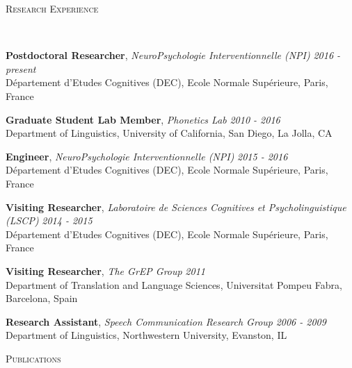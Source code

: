 \documentclass[9pt]{article}
\newenvironment{changemargin}[2]{%
  \begin{list}{}{%
    \setlength{\topsep}{0pt}%
    \setlength{\leftmargin}{#1}%
    \setlength{\rightmargin}{#2}%
    \setlength{\listparindent}{\parindent}%
    \setlength{\itemindent}{\parindent}%
    \setlength{\parsep}{\parskip}%
  }%
  \item[]}{\end{list}
}
\newcommand{\lineover}{
	\begin{changemargin}{-0.05in}{-0.05in}
		\vspace*{-8pt}
		\hrulefill \\
		\vspace*{-2pt}
	\end{changemargin}
}
\newcommand{\header}[1]{
	\begin{changemargin}{-0.5in}{-0.5in}
		\scshape{#1}\\
  	\lineover
	\end{changemargin}
}
\newenvironment{body} {
	\vspace*{-16pt}
	\begin{changemargin}{-0.25in}{-0.5in}
  }	
	{\end{changemargin}
}
\begin{document}
\smallskip


\header{Research Experience}

\begin{body}
	\vspace{14pt}
	\textbf{Postdoctoral Researcher}, \emph{NeuroPsychologie Interventionnelle (NPI)} \hfill \emph{2016 - present}\\
	D\'epartement d'Etudes Cognitives (DEC), Ecole Normale Sup\'erieure, Paris, France
	\medskip
	
	\textbf{Graduate Student Lab Member}, \emph{Phonetics Lab} \hfill \emph{2010 - 2016}\\
	Department of Linguistics, University of California, San Diego, La Jolla, CA\\
 	\medskip
	
	\textbf{Engineer}, \emph{NeuroPsychologie Interventionnelle (NPI)} \hfill \emph{2015 - 2016}\\
	D\'epartement d'Etudes Cognitives (DEC), Ecole Normale Sup\'erieure, Paris, France
	\medskip
	
	\textbf{Visiting Researcher}, \emph{Laboratoire de Sciences Cognitives et Psycholinguistique (LSCP)} \hfill \emph{2014 - 2015}\\
	D\'epartement d'Etudes Cognitives (DEC), Ecole Normale Sup\'erieure, Paris, France
	\medskip
	
	\textbf{Visiting Researcher}, \emph{The GrEP Group} \hfill \emph{2011}\\
	Department of Translation and Language Sciences, Universitat Pompeu Fabra, Barcelona, Spain
	\medskip
	
	\textbf{Research Assistant}, \emph{Speech Communication Research Group} \hfill \emph{2006 - 2009}\\
	Department of Linguistics, Northwestern University, Evanston, IL
\end{body}

\smallskip


\header{Publications}
\end{document}

